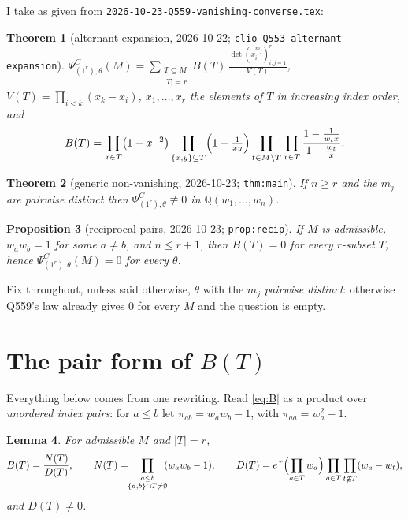 \documentclass[11pt]{article}
\newtheorem{theorem}{Theorem}
\newtheorem{proposition}[theorem]{Proposition}
\newtheorem{lemma}[theorem]{Lemma}
\theoremstyle{definition}
\theoremstyle{remark}
\newcommand{\PsiC}{\Psi^{C}}
\newcommand{\QQ}{\mathbb{Q}}
\begin{document}
I take as given from \texttt{2026-10-23-Q559-vanishing-converse.tex}:

\begin{theorem}[alternant expansion, 2026-10-22; \texttt{clio-Q553-alternant-expansion}]
\label{thm:alt}
$\displaystyle \PsiC_{(1^r),\theta}(M)=\sum_{\substack{T\subseteq M\\|T|=r}}
   B(T)\,\frac{\det(x_i^{m_j})_{i,j=1}^r}{V(T)}$, $V(T)=\prod_{i<k}(x_k-x_i)$,
$x_1,\dots,x_r$ the elements of $T$ in increasing index order, and
\begin{equation}\label{eq:B}
  B(T)=\prod_{x\in T}\bigl(1-x^{-2}\bigr)
       \prod_{\{x,y\}\subseteq T}\Bigl(1-\tfrac{1}{xy}\Bigr)
       \prod_{t\in M\setminus T}\prod_{x\in T}
          \frac{1-\frac{1}{w_tx}}{1-\frac{w_t}{x}} .
\end{equation}
\end{theorem}

\begin{theorem}[generic non-vanishing, 2026-10-23; \texttt{thm:main}]\label{thm:main}
If $n\ge r$ and the $m_j$ are pairwise distinct then
$\PsiC_{(1^r),\theta}\not\equiv0$ in $\QQ(w_1,\dots,w_n)$.
\end{theorem}

\begin{proposition}[reciprocal pairs, 2026-10-23; \texttt{prop:recip}]\label{prop:recip}
If $M$ is admissible, $w_aw_b=1$ for some $a\ne b$, and $n\le r+1$, then
$B(T)=0$ for every $r$-subset $T$, hence $\PsiC_{(1^r),\theta}(M)=0$ for every
$\theta$.
\end{proposition}

Fix throughout, unless said otherwise, $\theta$ with the $m_j$ \emph{pairwise
distinct}: otherwise Q559's law already gives $0$ for every $M$ and the question
is empty.

\section{The pair form of \texorpdfstring{$B(T)$}{B(T)}}

Everything below comes from one rewriting. Read \eqref{eq:B} as a product over
\emph{unordered index pairs}: for $a\le b$ let
$\pi_{ab}=w_aw_b-1$, with $\pi_{aa}=w_a^2-1$.

\begin{lemma}\label{lem:pair}
For admissible $M$ and $|T|=r$,
\[
  B(T)=\frac{N(T)}{D(T)},\qquad
  N(T)=\!\!\prod_{\substack{a\le b\\ \{a,b\}\cap T\ne\emptyset}}\!\!(w_aw_b-1),
  \qquad
  D(T)=e^{\,r}\Bigl(\prod_{a\in T}w_a\Bigr)
       \prod_{a\in T}\prod_{t\notin T}(w_a-w_t),
\]
and $D(T)\ne0$.
\end{lemma}
\end{document}
